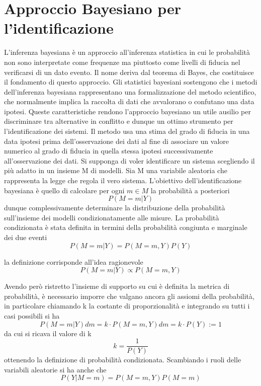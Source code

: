 \documentclass[10pt,a4paper,oneside,openany,noindent]{book}
\begin{document}
\section{Approccio Bayesiano per l’identificazione}
L’inferenza bayesiana è un approccio all’inferenza statistica in cui le probabilità
non sono interpretate come frequenze ma piuttosto come livelli di fiducia nel verificarsi di un dato evento. Il nome deriva dal teorema di Bayes, che costituisce il
fondamento di questo approccio. Gli statistici bayesiani sostengono che i metodi
dell’inferenza bayesiana rappresentano una formalizzazione del metodo scientifico,
che normalmente implica la raccolta di dati che avvalorano o confutano una data
ipotesi.
Queste caratteristiche rendono l’approccio bayesiano un utile ausilio per discriminare tra alternative in conflitto e dunque un ottimo strumento per l’identificazione
dei sistemi.
Il metodo usa una stima del grado di fiducia in una data ipotesi prima dell’osservazione
dei dati al fine di associare un valore numerico al grado di fiducia in quella stessa
ipotesi successivamente all’osservazione dei dati. Si supponga di voler identificare
un sistema scegliendo il più adatto in un insieme M di modelli.
Sia M una variabile aleatoria che rappresenta la legge che regola il vero sistema.
L’obiettivo dell’identificazione bayesiana è quello di calcolare per ogni $m\in M$ la
probabilità a posteriori
\begin{equation} P (M = m|Y )
\end{equation}
dunque complessivamente determinare la distribuzione della probabilità sull’insieme
dei modelli condizionatamente alle misure.
La probabilità condizionata è stata definita in termini della probabilità congiunta e
marginale dei due eventi
\begin{equation}
P (M = m|Y ) =
P (M = m, Y )
P (Y )
\end{equation}

la definizione corrisponde all’idea ragionevole
\begin{equation}
P (M = m|Y ) \propto P (M = m, Y )
\end{equation}

Avendo però ristretto l’insieme di supporto su cui è definita la metrica di probabilità,
è necessario imporre che valgano ancora gli assiomi della probabilità, in particolare
chiamando k la costante di proporzionalità e integrando su tutti i casi possibili si ha
\begin{equation}P (M = m|Y )dm =
k \cdot P (M = m, Y )dm = k \cdot P (Y ) := 1\end{equation}
da cui si ricava il valore di k
\begin{equation}
k =\frac{1}{P(Y)}
\end{equation}
ottenendo la definizione di probabilità condizionata.
Scambiando i ruoli delle variabili aleatorie si ha anche che
\begin{equation}
P (Y |M = m) =
P (M = m, Y )
P (M = m)
\end{equation}
\end{document}
